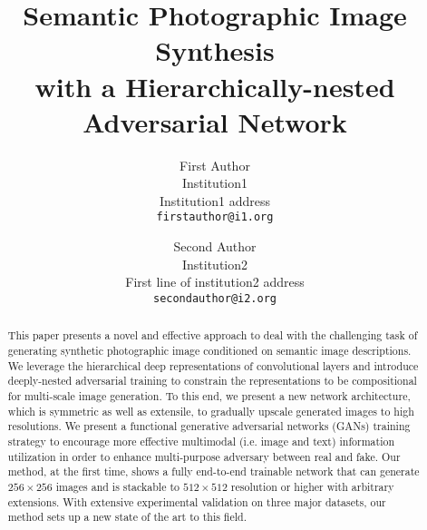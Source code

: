 \documentclass[10pt,twocolumn,letterpaper]{article}
\begin{document}
\title{Semantic Photographic Image Synthesis \\ with a Hierarchically-nested Adversarial Network}

\author{First Author\\
Institution1\\
Institution1 address\\
{\tt\small firstauthor@i1.org}
\and
Second Author\\
Institution2\\
First line of institution2 address\\
{\tt\small secondauthor@i2.org}
}

\maketitle

\begin{abstract}
This paper presents a novel  and effective approach to deal with the challenging task of generating synthetic photographic image conditioned on semantic image descriptions. We leverage the hierarchical deep representations of convolutional layers and introduce deeply-nested adversarial training to constrain the representations to be compositional for multi-scale image generation. To this end, we present a new network architecture, which is symmetric as well as extensile, to gradually upscale generated images to high resolutions.  We present a  functional generative adversarial networks (GANs) training strategy to encourage more effective multimodal (i.e. image and text) information utilization in order to enhance multi-purpose adversary between real and fake. Our method, at the first time, shows a fully end-to-end trainable network that can generate $256{\times}256$ images and is stackable to $512{\times}512$ resolution or higher with arbitrary extensions. With extensive experimental validation on three major datasets, our method sets up a new state of the art to this field. 

\end{abstract}


\end{document}
